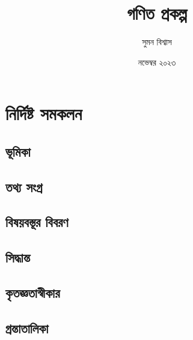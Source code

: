 \documentclass[12pt, a4paper]{book}
\title{ গণিত প্রকল্প }
\author{ সুমন বিশ্বাস }
\date{ নভেম্বর ২০২৩ }
\begin{document}
\frontmatter

\maketitle

\tableofcontents

\mainmatter

\chapter{ নির্দিষ্ট সমকলন }

\section{ ভূমিকা }


\section{ তথ্য সংগ্র }


\section{ বিষয়বস্তূর বিবরণ }


\section{ সিদ্ধান্ত }


\section{ কৃতজ্ঞতাস্বীকার }


\section{ গ্রন্তাতালিকা }
\begin{otherlanguage}{bengali}
    
     
    \end{otherlanguage}

\end{document}
